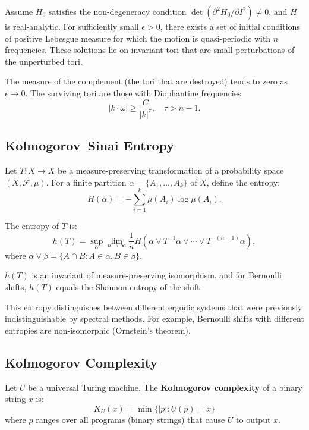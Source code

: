 \begin{theorem}
Assume $H_0$ satisfies the non-degeneracy condition $\det(\partial^2 H_0/\partial I^2) \neq 0$, and $H$ is real-analytic. For sufficiently small $\epsilon > 0$, there exists a set of initial conditions of positive Lebesgue measure for which the motion is quasi-periodic with $n$ frequencies. These solutions lie on invariant tori that are small perturbations of the unperturbed tori.
\end{theorem}

The measure of the complement (the tori that are destroyed) tends to zero as $\epsilon \to 0$. The surviving tori are those with Diophantine frequencies:
\[
|k \cdot \omega| \geq \frac{C}{|k|^{\tau}}, \quad \tau > n-1.
\]

\subsection{Kolmogorov--Sinai Entropy}

Let $T: X \to X$ be a measure-preserving transformation of a probability space $(X, \mathcal{F}, \mu)$. For a finite partition $\alpha = \{A_1,\dots,A_k\}$ of $X$, define the entropy:
\[
H(\alpha) = -\sum_{i=1}^k \mu(A_i) \log \mu(A_i).
\]

The entropy of $T$ is:
\[
h(T) = \sup_{\alpha} \lim_{n \to \infty} \frac{1}{n} H(\alpha \vee T^{-1}\alpha \vee \cdots \vee T^{-(n-1)}\alpha),
\]
where $\alpha \vee \beta = \{A \cap B : A \in \alpha, B \in \beta\}$.

\begin{theorem}
$h(T)$ is an invariant of measure-preserving isomorphism, and for Bernoulli shifts, $h(T)$ equals the Shannon entropy of the shift.
\end{theorem}

This entropy distinguishes between different ergodic systems that were previously indistinguishable by spectral methods. For example, Bernoulli shifts with different entropies are non-isomorphic (Ornstein's theorem).

\subsection{Kolmogorov Complexity}

\begin{definition}
Let $U$ be a universal Turing machine. The \textbf{Kolmogorov complexity} of a binary string $x$ is:
\[
K_U(x) = \min\{|p| : U(p) = x\}
\]
where $p$ ranges over all programs (binary strings) that cause $U$ to output $x$.
\end{definition}

